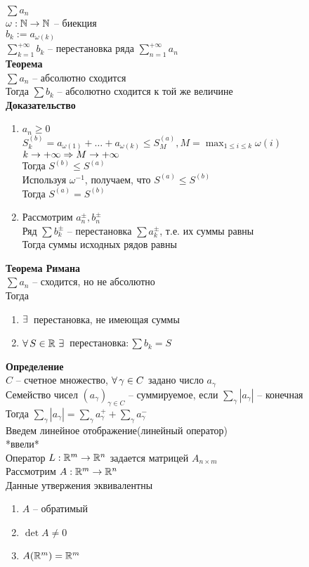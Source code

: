 \documentclass[12pt]{article}
\begin{document}
\begin{enumerate}
    $\sum a_n$\\
    $\omega: \mathbb{N} \rightarrow \mathbb{N}$ -- биекция\\
    $b_k := a_{\omega(k)}$\\
    $\sum_{k=1}^{+\infty} b_k$ -- перестановка ряда $\sum_{n=1}^{+\infty} a_n$\\
    \textbf{Теорема}\\
    $\sum a_n$ -- абсолютно сходится\\
    Тогда $\sum b_k$ -- абсолютно сходится к той же величине\\
    \textbf{Доказательство}
    \begin{enumerate}
        \item $a_n \geq 0$\\
        $S_k^{(b)} = a_{\omega(1)} + \ldots + a_{\omega(k)} \leq S_M^{(a)}, M = \max_{1 \leq i \leq k} \omega(i)$\\
        $k\rightarrow +\infty \Rightarrow M \rightarrow +\infty$\\
        Тогда $S^{(b)} \leq S^{(a)}$\\
        Используя $\omega^{-1}$, получаем, что $S^{(a)} \leq S^{(b)}$\\
        Тогда $S^{(a)} = S^{(b)}$
        \item Рассмотрим $a_n^\pm, b_n^\pm$\\
        Ряд $\sum b_k^\pm$ -- перестановка $\sum a_k^\pm$, т.е. их суммы равны\\
        Тогда суммы исходных рядов равны
    \end{enumerate}
    \textbf{Теорема Римана}\\
    $\sum a_n$ -- сходится, но не абсолютно\\
    Тогда \begin{enumerate}
        \item $\exists\,$ перестановка, не имеющая суммы
        \item $\forall\, S \in \mathbb{R}\ \exists\, $ перестановка$: \sum b_k = S$
    \end{enumerate}
\end{enumerate}
\textbf{Определение}\\
$C$ -- счетное множество, $\forall\, \gamma \in C$ задано число $a_\gamma$\\
Семейство чисел $(a_\gamma)_{\gamma \in C}$ -- суммируемое, если $\sum_{\gamma} |a_\gamma|$ -- конечная\\
Тогда $\sum_\gamma |a_\gamma| = \sum_\gamma a^+_\gamma + \sum_\gamma a^-_\gamma$\\
Введем линейное отображение(линейный оператор)\\
*ввели*\\
Оператор $L: \mathbb{R}^m \rightarrow \mathbb{R}^n$ задается матрицей $A_{n\times m}$\\
Рассмотрим $A: \mathbb{R}^m \rightarrow \mathbb{R}^n$\\
Данные утвержения эквивалентны\\
\begin{enumerate}
    \item $A$ -- обратимый
    \item $\det A\neq 0$
    \item $A(\mathbb{R}^m) = \mathbb{R}^m$
\end{enumerate}
\end{document}
